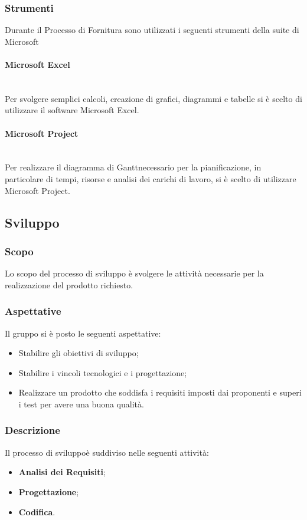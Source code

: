 \subsubsection{Strumenti}
Durante il Processo di Fornitura sono utilizzati i seguenti strumenti della suite di Microsoft
\paragraph{Microsoft Excel}\mbox{}\\ [1mm]
Per svolgere semplici calcoli, creazione di grafici, diagrammi e tabelle si è scelto di utilizzare il software Microsoft Excel.
\paragraph{Microsoft Project}\mbox{}\\ [1mm]
Per realizzare il diagramma di Gantt\glosp necessario per la pianificazione, in particolare di tempi, risorse e analisi dei carichi di lavoro, si è scelto di utilizzare Microsoft Project.


\subsection{Sviluppo}
\subsubsection{Scopo}
Lo scopo del processo di sviluppo è svolgere le attività necessarie per la realizzazione del prodotto richiesto.
\subsubsection{Aspettative}
Il gruppo si è posto le seguenti aspettative:
\begin{itemize}
	\item Stabilire gli obiettivi di sviluppo;
	\item Stabilire i vincoli tecnologici e i progettazione;
	\item Realizzare un prodotto che soddisfa i requisiti imposti dai proponenti e superi i test per avere una buona qualità.
\end{itemize}
\subsubsection{Descrizione}
Il processo di sviluppo\glosp è suddiviso nelle seguenti attività:
\begin{itemize}
	\item \textbf{Analisi dei Requisiti};
	\item \textbf{Progettazione};
	\item \textbf{Codifica}.
\end{itemize}
